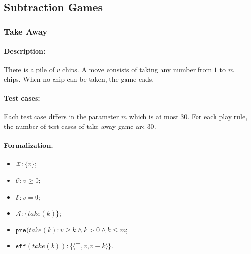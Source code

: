 \documentclass[review]{elsarticle}
\newcommand{\set}[1]{\{ #1 \}}
\newcommand{\tuple}[1]{\langle {#1} \rangle}
\newcommand{\true}{\top}
\newcommand{\statevar}{\mathcal{X}}
\newcommand{\act}{\mathcal{A}}
\newcommand{\constraint}{\mathcal{C}}
\newcommand{\estate}{\mathcal{E}}
\newcommand{\pre}{\mathtt{pre}}
\newcommand{\eff}{\mathtt{eff}}
\begin{document}


\subsection{Subtraction Games}

\subsubsection{Take Away \protect\cite{Gol1966}}
\paragraph{Description:}
There is a pile of $v$ chips. 
A move consists of taking any number from $1$ to $m$ chips.
When no chip can be taken, the game ends.

\paragraph{Test cases:} 
Each test case differs in the parameter $m$ which is at most $30$.
For each play rule, the number of test cases of take away game are $30$. %

\paragraph{Formalization:}

\begin{itemize}
	\item $\statevar: \set{v}$;
	\item $\constraint: v \ge 0$;
	\item $\estate: v = 0$;
	\item $\act:\set{take(k)}$;
	\item $\pre(take(k): v \ge k \wedge  k > 0 \wedge k \le m$;
	\item $\eff(take(k)): \set{\tuple{\true, v, v - k}}$.
\end{itemize}
\end{document}
